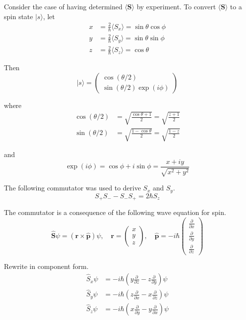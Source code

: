 Consider the case of having determined $\langle\mathbf S\rangle$ by experiment.
To convert $\langle\mathbf S\rangle$ to a spin state $|s\rangle$, let
\begin{align*}
x&=\frac{2}{\hbar}\langle S_x\rangle=\sin\theta\cos\phi
\\
y&=\frac{2}{\hbar}\langle S_y\rangle=\sin\theta\sin\phi
\\
z&=\frac{2}{\hbar}\langle S_z\rangle=\cos\theta
\end{align*}

Then
\begin{equation*}
|s\rangle=\begin{pmatrix}\cos(\theta/2)\\\sin(\theta/2)\exp(i\phi)\end{pmatrix}
\end{equation*}

where
\begin{align*}
\cos(\theta/2)&=\sqrt{\frac{\cos\theta+1}{2}}=\sqrt{\frac{z+1}{2}}
\\
\sin(\theta/2)&=\sqrt{\frac{1-\cos\theta}{2}}=\sqrt{\frac{1-z}{2}}
\end{align*}

and
\begin{equation*}
\exp(i\phi)=\cos\phi+i\sin\phi=\frac{x+iy}{\sqrt{x^2+y^2}}
\end{equation*}

The following commutator was used to derive $S_x$ and $S_y$.
\begin{equation*}
S_+S_--S_-S_+=2\hbar S_z
\end{equation*}

The commutator is a consequence of the following wave equation for spin.
\begin{equation*}
\hat{\mathbf S}\psi=(\mathbf r\times\hat{\mathbf p})\psi,\quad
\mathbf r=\begin{pmatrix}x\\y\\z\end{pmatrix},\quad
\hat{\mathbf p}=-i\hbar\begin{pmatrix}
\frac{\partial}{\partial x}
\\
\frac{\partial}{\partial y}
\\
\frac{\partial}{\partial z}
\end{pmatrix}
\end{equation*}

Rewrite in component form.
\begin{align*}
\hat S_x\psi&=-i\hbar\left(y\frac{\partial}{\partial z}-z\frac{\partial}{\partial y}\right)\psi
\\
\hat S_y\psi&=-i\hbar\left(z\frac{\partial}{\partial x}-x\frac{\partial}{\partial z}\right)\psi
\\
\hat S_z\psi&=-i\hbar\left(x\frac{\partial}{\partial y}-y\frac{\partial}{\partial x}\right)\psi
\end{align*}

